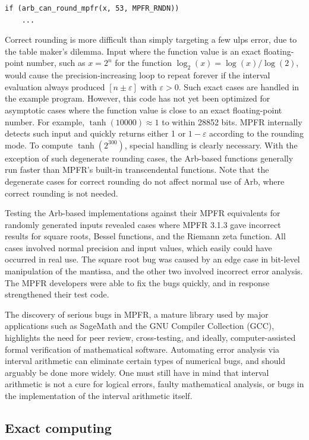 \documentclass[10pt,journal,compsoc,cspaper]{IEEEtran}
\begin{document}
\begin{verbatim}
if (arb_can_round_mpfr(x, 53, MPFR_RNDN))
    ...
\end{verbatim}

Correct rounding is more difficult than simply targeting a few ulps error,
due to the table maker's dilemma.
Input where the function value is an exact floating-point number,
such as $x = 2^n$ for the function $\log_2(x) = \log(x) / \log(2)$,
would cause the precision-increasing loop to repeat forever
if the interval evaluation always produced
$[n \pm \varepsilon]$ with $\varepsilon > 0$.
Such exact cases are handled in the example program.
However, this code has not yet been optimized
for asymptotic cases where the function value is close to an exact floating-point number.
For example, $\tanh(10000) \approx 1$ to within 28852 bits.
MPFR internally detects such input and quickly returns either 1 or $1 - \varepsilon$
according to the rounding mode.
To compute $\tanh(2^{300})$, special handling is clearly necessary.
With the exception of such degenerate rounding cases,
the Arb-based functions generally run
faster than MPFR's built-in transcendental functions.
Note that the degenerate cases for correct rounding
do not affect normal use of Arb,
where correct rounding is not needed.

Testing the Arb-based implementations against their MPFR equivalents
for randomly generated inputs revealed cases where MPFR 3.1.3 gave
incorrect results for square roots, Bessel functions, and the
Riemann zeta function.
All cases involved normal precision and input values, which easily could
have occurred in real use.
The square root bug was caused by an edge case in bit-level
manipulation of the mantissa,
and the other two involved incorrect error analysis.
The MPFR developers were able to fix the bugs quickly,
and in response strengthened their test code.

The discovery of serious bugs in MPFR, a mature library
used by major applications such as SageMath and the GNU Compiler Collection (GCC),
highlights the need for peer review, cross-testing, and ideally,
computer-assisted formal verification of mathematical software.
Automating error analysis via interval arithmetic
can eliminate certain types of numerical bugs,
and should arguably be done more widely.
One must still have in mind that interval arithmetic is
not a cure for logical errors, faulty mathematical analysis, or bugs in the
implementation of the interval arithmetic itself.

\subsection{Exact computing}
\end{document}
